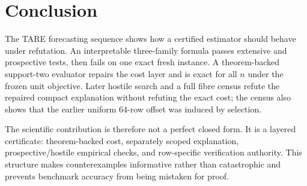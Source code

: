 \section{Conclusion}

The TARE forecasting sequence shows how a certified estimator should behave under refutation. An interpretable three-family formula passes extensive and prospective tests, then fails on one exact fresh instance. A theorem-backed support-two evaluator repairs the cost layer and is exact for all $n$ under the frozen unit objective. Later hostile search and a full fibre census refute the repaired compact explanation without refuting the exact cost; the census also shows that the earlier uniform 64-row offset was induced by selection.

The scientific contribution is therefore not a perfect closed form. It is a layered certificate: theorem-backed cost, separately scoped explanation, prospective/hostile empirical checks, and row-specific verification authority. This structure makes counterexamples informative rather than catastrophic and prevents benchmark accuracy from being mistaken for proof.
